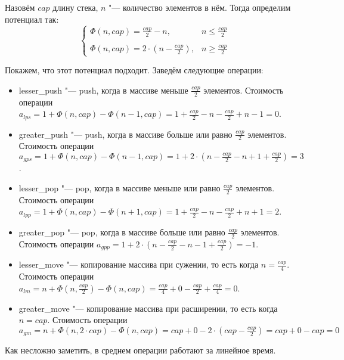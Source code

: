 \section{}
	Назовём $cap$ длину стека, $n$ "--- количество элементов в нём. Тогда определим потенциал так:
	\begin{equation*}
		\begin{cases}
			\Phi(n, cap) = \frac{cap}{2} - n, & n \leq \frac{cap}{2}\\ \\
			\Phi(n, cap) = 2\cdot\left(n - \frac{cap}{2}\right), & n\geq \frac{cap}{2}
		\end{cases}
	\end{equation*}
	
	Покажем, что этот потенциал подходит. Заведём следующие операции:
	
	\begin{itemize}
		\item lesser\_push "--- push, когда в массиве меньше $\frac{cap}{2}$ элементов. Стоимость операции $a_{lps} = 1 + \Phi(n, cap) - \Phi(n-1, cap) = 1 + \frac{cap}{2} - n - \frac{cap}{2} + n - 1 = 0$.\\
		
		\item greater\_push "--- push, когда в массиве больше или равно $\frac{cap}{2}$ элементов. Стоимость операции $a_{gps} = 1 + \Phi(n, cap) - \Phi(n-1, cap) = 1 + 2\cdot\left(n - \frac{cap}{2} - n + 1 + \frac{cap}{2} \right) = 3$.\\
		
		\item lesser\_pop "--- pop, когда в массиве меньше или равно $\frac{cap}{2}$ элементов. Стоимость операции $a_{lpp} = 1 + \Phi(n, cap) - \Phi(n+1, cap) = 1 + \frac{cap}{2} - n - \frac{cap}{2} + n + 1 = 2$.\\
		
		\item greater\_pop "--- pop, когда в массиве больше или равно $\frac{cap}{2}$ элементов. Стоимость операции $a_{gpp} = 1 +  2\cdot\left(n - \frac{cap}{2} - n - 1 + \frac{cap}{2} \right) = -1$.\\
		
		\item lesser\_move "--- копирование массива при сужении, то есть когда $n = \frac{cap}{4}$. Стоимость операции $a_{lm} = n + \Phi(n, \frac{cap}{2}) - \Phi(n, cap) = \frac{cap}{4} + 0 - \frac{cap}{2} + \frac{cap}{4} = 0$.\\
		 
		\item greater\_move "--- копирование массива при расширении, то есть когда $n = cap$. Стоимость операции $a_{gm} = n + \Phi(n, 2\cdot cap) - \Phi(n, cap) = cap + 0 - 2\cdot(cap - \frac{cap}{2}) = cap + 0 - cap = 0$
	\end{itemize}

	Как несложно заметить, в среднем операции работают за линейное время.